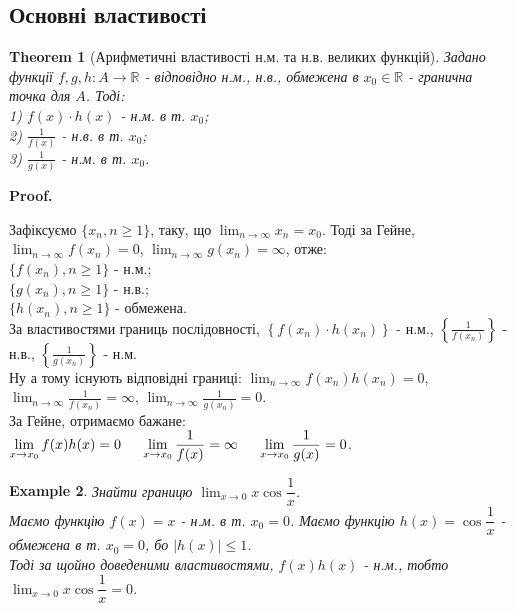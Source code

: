 \documentclass[a4paper, 14pt]{article}
\makeatletter
\def\qed{$\blacksquare$}
\theoremstyle{theoremdd}
\newtheorem{theorem}{Theorem}[subsection]
\theoremstyle{theoremdd}
\theoremstyle{theoremdd}
\theoremstyle{theoremdd}
\newtheorem{example}[theorem]{Example}
\theoremstyle{theoremdd}
\theoremstyle{theoremdd}
\theoremstyle{theoremdd}
\theoremstyle{theoremdd}
\renewenvironment{proof}[1][Proof.\\]{\par
\pushQED{\hfill \qed}%
\normalfont \topsep6\p@\@plus6\p@\relax
\trivlist
\item\relax
{\bfseries
#1\@addpunct{.}}\hspace\labelsep\ignorespaces
}{%
\popQED\endtrivlist\@endpefalse
}
\makeatother
\begin{document}
	\subsection{Основні властивості}
	\begin{theorem}[Арифметичні властивості н.м. та н.в. великих функцій]
	Задано функції $f,g,h: A \to \mathbb{R}$ - відповідно н.м., н.в., обмежена в $x_0 \in \mathbb{R}$ - гранична точка для $A$. Тоді:\\
	1) $f(x) \cdot h(x)$ - н.м. в т. $x_0$;\\
	2) $\displaystyle \frac{1}{f(x)}$ - н.в. в т. $x_0$;\\
	3) $\displaystyle \frac{1}{g(x)}$ - н.м. в т. $x_0$.
	\end{theorem}
	
	\begin{proof}
	Зафіксуємо $\{x_n, n \geq 1\}$, таку, що $\displaystyle \lim_{n \to \infty} x_n = x_0$. Тоді за Гейне, \\ 
	$\displaystyle \lim_{n \to \infty} f(x_n) = 0$, $\displaystyle \lim_{n \to \infty} g(x_n) = \infty$, отже:\\
	$\{f(x_n), n \geq 1\}$ - н.м.;\\
	$\{g(x_n), n \geq 1\}$ - н.в.;\\
	$\{h(x_n), n \geq 1\}$ - обмежена.\\
	За властивостями границь послідовності, $\left\{f(x_n) \cdot h(x_n) \right\}$ - н.м., $\left\{ \displaystyle \frac{1}{f(x_n)} \right\}$ - н.в., $\left\{ \displaystyle \frac{1}{g(x_n)} \right\}$ - н.м.\\
	Ну а тому існують відповідні границі: $\displaystyle \lim_{n \to \infty} f(x_n) h(x_n) = 0$, $\displaystyle \lim_{n \to \infty} \frac{1}{f(x_n)} = \infty$, $\displaystyle \lim_{n \to \infty} \frac{1}{g(x_n)} = 0$.\\
	За Гейне, отримаємо бажане: $\displaystyle\lim_{x \to x_0} f(x)h(x) = 0 \hspace{0.5cm} \displaystyle\lim_{x \to x_0} \dfrac{1}{f(x)} = \infty \hspace{0.5cm} \displaystyle\lim_{x \to x_0} \dfrac{1}{g(x)} = 0$.
	\end{proof}
	
	\begin{example}
	Знайти границю $\displaystyle\lim_{x \to 0} x \cos \dfrac{1}{x}$.\\
	Маємо функцію $f(x) = x$ - н.м. в т. $x_0 = 0$. Маємо функцію $h(x) = \cos \dfrac{1}{x}$ - обмежена в т. $x_0 = 0$, бо $|h(x)| \leq 1$.\\
	Тоді за щойно доведеними властивостями, $f(x)h(x)$ - н.м., тобто $\displaystyle\lim_{x \to 0} x \cos \dfrac{1}{x} = 0$.
	\end{example}
	
\end{document}
